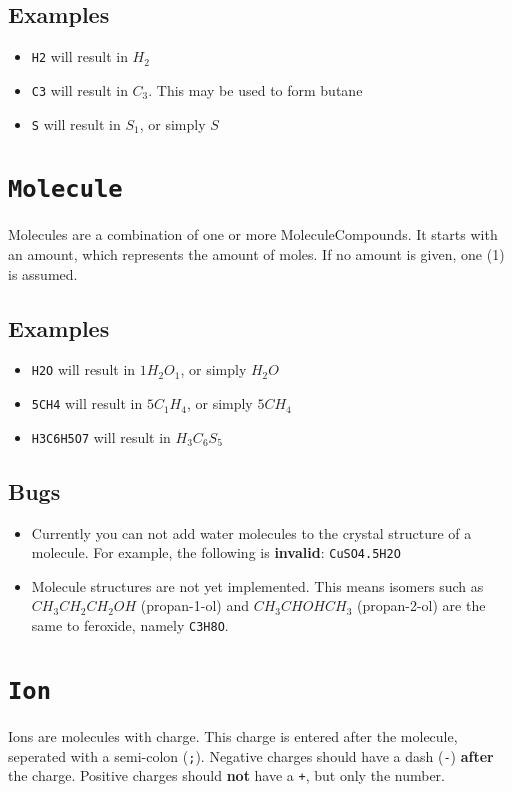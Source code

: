 \documentclass[11pt]{article}
\def\code#1{\texttt{#1}}
\begin{document}
\subsection{Examples}
\begin{itemize}
  \item{\code{H2} will result in $H_2$}
  \item{\code{C3} will result in $C_3$. This may be used to form butane}
  \item{\code{S} will result in $S_1$, or simply $S$}
\end{itemize}


\section{\code{Molecule}}
Molecules are a combination of one or more MoleculeCompounds. It starts with
an amount, which represents the amount of moles. If no amount is given,
one (1) is assumed.

\subsection{Examples}
\begin{itemize}
  \item{\code{H2O} will result in $1H_2O_1$, or simply $H_2O$}
  \item{\code{5CH4} will result in $5C_1H_4$, or simply $5CH_4$}
  \item{\code{H3C6H5O7} will result in $H_3C_6S_5$}
\end{itemize}

\subsection{Bugs}
\begin{itemize}
\item{Currently you can not add water molecules to the crystal structure of a molecule. For example, the following is \textbf{invalid}: \code{CuSO4.5H2O}}
\item{Molecule structures are not yet implemented. This means isomers such as $CH_3CH_2CH_2OH$ (propan-1-ol) and $CH_3CHOHCH_3$ (propan-2-ol) are the same to feroxide, namely \code{C3H8O}.}
\end{itemize}


\section{\code{Ion}}
Ions are molecules with charge. This charge is entered after the molecule, seperated with a semi-colon (\code{;}). Negative charges should have a dash (\code{-}) \textbf{after} the charge. Positive charges should \textbf{not} have a \code{+}, but only the number.
\end{document}
